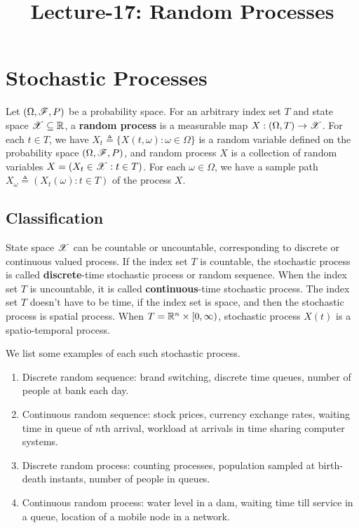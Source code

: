 \documentclass[letterpaper,10pt,english]{article}
\title{Lecture-17: Random Processes}
\author{}
\begin{document}
\maketitle

\section{Stochastic Processes} 

Let $(\Omega, \mathscr{F}, P)$ be a probability space. 
For an arbitrary index set $T$ and state space $\mathscr{X} \subseteq \mathbb{R}$, a \textbf{random process} is a measurable map $X : (\Omega, T) \to \mathscr{X}$. 
For each $t \in T$, we have $X_t \triangleq \{X(t, \omega): \omega \in \Omega\}$ is a random variable defined on the probability space $(\Omega, \mathscr{F}, P)$, 
and random process $X$ is a collection of random variables $X = (X_t \in \mathscr{X}: t \in T)$. 
For each $\omega \in \Omega$, we have a sample path $X_{\omega} \triangleq (X_t(\omega): t \in T)$ of the process $X$. 


\subsection{Classification}
State space $\mathscr{X}$ can be countable or uncountable, corresponding to discrete or continuous valued process.  
If the index set $T$ is countable, the stochastic process is called \textbf{discrete}-time stochastic process or random sequence. 
When the index set $T$ is uncountable, it is called \textbf{continuous}-time stochastic process. 
The index set $T$ doesn't have to be time, if the index set is space, and then the stochastic process is spatial process. 
When $T = \mathbb{R}^n \times [0, \infty)$, stochastic process $X(t)$ is a spatio-temporal process. 
\begin{shaded*}
\begin{exmp}
We list some examples of each such stochastic process. 
\begin{enumerate}[i\_]
\item Discrete random sequence: brand switching, discrete time queues, number of people at bank each day.
\item Continuous random sequence: stock prices, currency exchange rates, waiting time in queue of $n$th arrival, workload at arrivals in time sharing computer systems.
\item Discrete random process:  counting processes, population sampled at birth-death instants, number of people in queues.
\item Continuous random process: water level in a dam, waiting time till service in a queue, location of a mobile node in a network.
\end{enumerate}
\end{exmp}
\end{shaded*}
\end{document}
